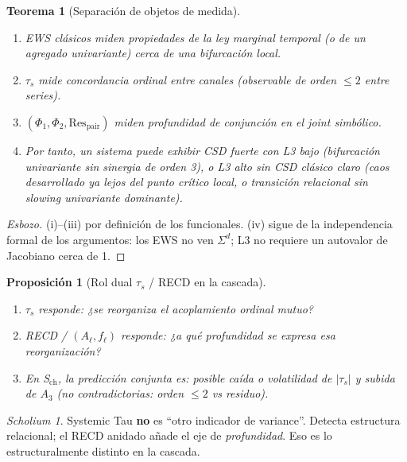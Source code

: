 \documentclass[11pt,a4paper]{article}
\theoremstyle{definition}
\theoremstyle{plain}
\newtheorem{proposition}{Proposici\'on}[section]
\newtheorem{theorem}{Teorema}[section]
\theoremstyle{remark}
\newtheorem{scholium}{Scholium}[section]
\newcommand{\Res}{\mathrm{Res}}
\newcommand{\ts}{\tau_s}
\begin{document}
\begin{theorem}[Separaci\'on de objetos de medida]
\label{thm:sep}
\begin{enumerate}[label=(\roman*)]
  \item EWS cl\'asicos miden propiedades de la \emph{ley marginal
  temporal} (o de un agregado univariante) cerca de una bifurcaci\'on
  local.
  \item $\ts$ mide \emph{concordancia ordinal entre canales}
  (observable de orden $\le 2$ entre series).
  \item $(\Phi_1,\Phi_2,\Res_{\mathrm{pair}})$ miden
  \emph{profundidad de conjunción} en el joint simb\'olico.
  \item Por tanto, un sistema puede exhibir CSD fuerte con L3 bajo
  (bifurcaci\'on univariante sin sinergia de orden 3), o L3 alto sin CSD
  cl\'asico claro (caos desarrollado ya lejos del punto cr\'itico local,
  o transici\'on relacional sin slowing univariante dominante).
\end{enumerate}
\end{theorem}

\begin{proof}[Esbozo]
(i)--(iii) por definici\'on de los funcionales. (iv) sigue de la
independencia formal de los argumentos: los EWS no ven $\Sigma^d$; L3
no requiere un autovalor de Jacobiano cerca de 1.
\end{proof}

\begin{proposition}[Rol dual $\ts$ / RECD en la cascada]
\label{prop:dual}
\begin{enumerate}[label=(\roman*)]
  \item $\ts$ responde: \emph{¿se reorganiza el acoplamiento ordinal
  mutuo?}
  \item RECD / $(A_\ell,f_\ell)$ responde: \emph{¿a qu\'e profundidad
  se expresa esa reorganizaci\'on?}
  \item En S$_{\mathrm{ch}}$, la predicci\'on conjunta es: posible ca\'ida
  o volatilidad de $|\ts|$ \emph{y} subida de $A_3$ (no
  contradictorias: orden $\le 2$ vs residuo).
\end{enumerate}
\end{proposition}

\begin{scholium}
Systemic Tau \textbf{no} es ``otro indicador de variance''. Detecta
estructura relacional; el RECD anidado a\~nade el eje de
\emph{profundidad}. Eso es lo estructuralmente distinto en la cascada.
\end{scholium}
\end{document}
